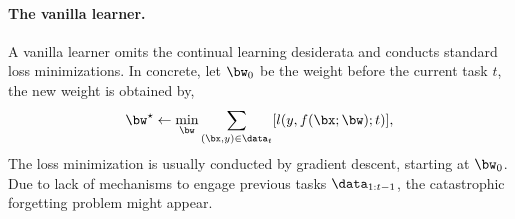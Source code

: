 \paragraph{The vanilla learner.}
A vanilla learner omits the continual learning desiderata and conducts standard loss minimizations. In concrete, let $\bw_0$ be the weight before the current task $t$, the new weight is obtained by,
\begin{align}
    \bw^{\star} \leftarrow \min_{\bw} \sum_{(\bx, y) \in \data_{t}} [l(y, f(\bx; \bw); t)],
\end{align}
The loss minimization is usually conducted by gradient descent, starting at $\bw_0$. Due to lack of mechanisms to engage previous tasks $\data_{1:t-1}$, the catastrophic forgetting problem might appear.